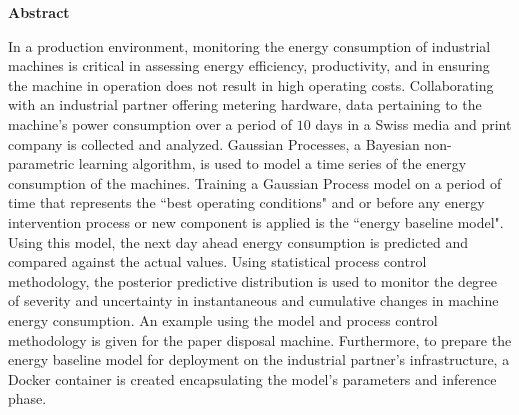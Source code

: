 \thispagestyle{plain}
\begin{center}
    \large
    \textbf{Abstract}
\end{center}

In a production environment, monitoring the energy consumption of industrial machines is critical in assessing energy efficiency, productivity, and in ensuring the machine in operation does not result in high operating costs. Collaborating with an industrial partner offering metering hardware, data pertaining to the machine's power consumption over a period of $10$ days in a Swiss media and print company is collected and analyzed. Gaussian Processes, a Bayesian non-parametric learning algorithm, is used to model a time series of the energy consumption of the machines. Training a Gaussian Process model on a period of time that represents the ``best operating conditions" and or before any energy intervention process or new component is applied is the ``energy baseline model". Using this model, the next day ahead energy consumption is predicted and compared against the actual values. Using statistical process control methodology, the posterior predictive distribution is used to monitor the degree of severity and uncertainty in instantaneous and cumulative changes in machine energy consumption. An example using the model and process control methodology is given for the paper disposal machine. Furthermore, to prepare the energy baseline model for deployment on the industrial partner's infrastructure, a Docker container is created encapsulating the model's parameters and inference phase. 